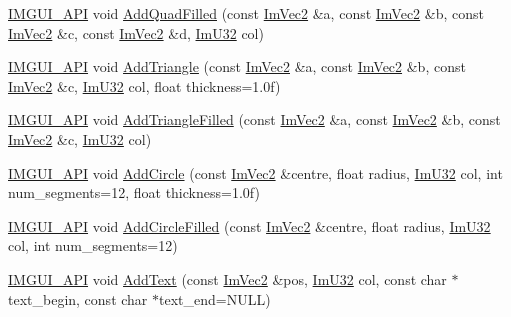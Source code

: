 \begin{DoxyCompactItemize}
\item 
\mbox{\hyperlink{imgui_8h_a43829975e84e45d1149597467a14bbf5}{I\+M\+G\+U\+I\+\_\+\+A\+PI}} void \mbox{\hyperlink{struct_im_draw_list_abefdc71c2dc6b6331193aee3ff680ed0}{Add\+Quad\+Filled}} (const \mbox{\hyperlink{struct_im_vec2}{Im\+Vec2}} \&a, const \mbox{\hyperlink{struct_im_vec2}{Im\+Vec2}} \&b, const \mbox{\hyperlink{struct_im_vec2}{Im\+Vec2}} \&c, const \mbox{\hyperlink{struct_im_vec2}{Im\+Vec2}} \&d, \mbox{\hyperlink{imgui_8h_a118cff4eeb8d00e7d07ce3d6460eed36}{Im\+U32}} col)
\item 
\mbox{\hyperlink{imgui_8h_a43829975e84e45d1149597467a14bbf5}{I\+M\+G\+U\+I\+\_\+\+A\+PI}} void \mbox{\hyperlink{struct_im_draw_list_ad04c8e04644b1cf54c7c7b8f352d5e41}{Add\+Triangle}} (const \mbox{\hyperlink{struct_im_vec2}{Im\+Vec2}} \&a, const \mbox{\hyperlink{struct_im_vec2}{Im\+Vec2}} \&b, const \mbox{\hyperlink{struct_im_vec2}{Im\+Vec2}} \&c, \mbox{\hyperlink{imgui_8h_a118cff4eeb8d00e7d07ce3d6460eed36}{Im\+U32}} col, float thickness=1.\+0f)
\item 
\mbox{\hyperlink{imgui_8h_a43829975e84e45d1149597467a14bbf5}{I\+M\+G\+U\+I\+\_\+\+A\+PI}} void \mbox{\hyperlink{struct_im_draw_list_a2395370cf2dab19fce3c0e2542cd4f25}{Add\+Triangle\+Filled}} (const \mbox{\hyperlink{struct_im_vec2}{Im\+Vec2}} \&a, const \mbox{\hyperlink{struct_im_vec2}{Im\+Vec2}} \&b, const \mbox{\hyperlink{struct_im_vec2}{Im\+Vec2}} \&c, \mbox{\hyperlink{imgui_8h_a118cff4eeb8d00e7d07ce3d6460eed36}{Im\+U32}} col)
\item 
\mbox{\hyperlink{imgui_8h_a43829975e84e45d1149597467a14bbf5}{I\+M\+G\+U\+I\+\_\+\+A\+PI}} void \mbox{\hyperlink{struct_im_draw_list_a26c34a87eca6aefa02ca4e4951dcd170}{Add\+Circle}} (const \mbox{\hyperlink{struct_im_vec2}{Im\+Vec2}} \&centre, float radius, \mbox{\hyperlink{imgui_8h_a118cff4eeb8d00e7d07ce3d6460eed36}{Im\+U32}} col, int num\+\_\+segments=12, float thickness=1.\+0f)
\item 
\mbox{\hyperlink{imgui_8h_a43829975e84e45d1149597467a14bbf5}{I\+M\+G\+U\+I\+\_\+\+A\+PI}} void \mbox{\hyperlink{struct_im_draw_list_a293e87d22e17587e3994cf6deb20be45}{Add\+Circle\+Filled}} (const \mbox{\hyperlink{struct_im_vec2}{Im\+Vec2}} \&centre, float radius, \mbox{\hyperlink{imgui_8h_a118cff4eeb8d00e7d07ce3d6460eed36}{Im\+U32}} col, int num\+\_\+segments=12)
\item 
\mbox{\hyperlink{imgui_8h_a43829975e84e45d1149597467a14bbf5}{I\+M\+G\+U\+I\+\_\+\+A\+PI}} void \mbox{\hyperlink{struct_im_draw_list_ac5221bd86b3429f6d5b6e6ffe454942d}{Add\+Text}} (const \mbox{\hyperlink{struct_im_vec2}{Im\+Vec2}} \&pos, \mbox{\hyperlink{imgui_8h_a118cff4eeb8d00e7d07ce3d6460eed36}{Im\+U32}} col, const char $\ast$text\+\_\+begin, const char $\ast$text\+\_\+end=N\+U\+LL)

\end{DoxyCompactItemize}
